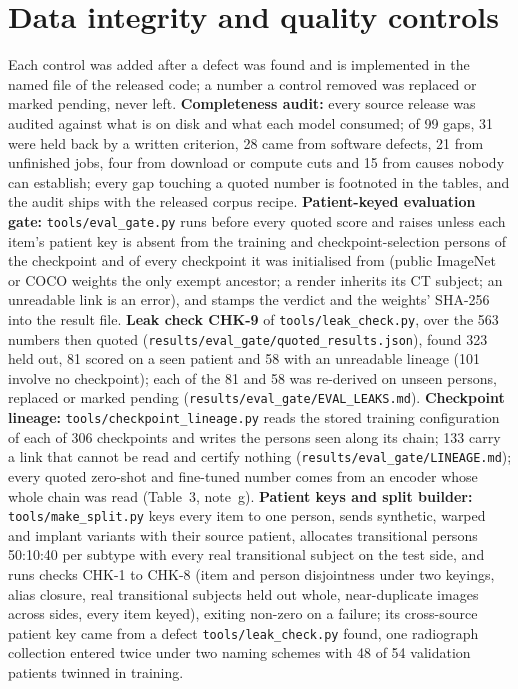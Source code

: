 \section*{Data integrity and quality controls}
Each control was added after a defect was found and is implemented in the named file of the released code; a
number a control removed was replaced or marked pending, never left. \textbf{Completeness audit:} every source
release was audited against what is on disk and what each model consumed; of 99 gaps, 31 were held back by a written
criterion, 28 came from software defects, 21 from unfinished jobs, four from download or compute cuts and 15 from
causes nobody can establish; every gap touching a quoted number is footnoted in the tables, and the audit ships with
the released corpus recipe. \textbf{Patient-keyed evaluation gate:}
\texttt{tools/eval\_gate.py} runs before every quoted score and raises unless each item's patient key is absent from
the training and checkpoint-selection persons of the checkpoint and of every checkpoint it was initialised from
(public ImageNet or COCO weights the only exempt ancestor; a render inherits its CT subject; an unreadable link is an
error), and stamps the verdict and the weights' SHA-256 into the result file.
\textbf{Leak check CHK-9} of \texttt{tools/leak\_check.py}, over the 563 numbers then quoted
(\texttt{results/eval\_gate/quoted\_results.json}), found 323 held out, 81 scored on a seen patient and 58 with an
unreadable lineage (101 involve no checkpoint); each of the 81 and 58 was re-derived on unseen persons, replaced or
marked pending (\texttt{results/eval\_gate/EVAL\_LEAKS.md}). \textbf{Checkpoint lineage:}
\texttt{tools/checkpoint\_lineage.py} reads the stored training configuration of each of 306 checkpoints and writes
the persons seen along its chain; 133 carry a link that cannot be read and certify nothing
(\texttt{results/eval\_gate/LINEAGE.md}); every quoted zero-shot and fine-tuned number comes from an encoder whose
whole chain was read (Table~3, note~g). \textbf{Patient keys and
split builder:} \texttt{tools/make\_split.py} keys every item to one person, sends synthetic, warped and implant
variants with their source patient, allocates transitional persons 50:10:40 per subtype with every real transitional
subject on the test side, and runs checks CHK-1 to CHK-8 (item and person disjointness under two keyings, alias
closure, real transitional subjects held out whole, near-duplicate images across sides, every item keyed), exiting
non-zero on a failure; its cross-source patient key came from a defect \texttt{tools/leak\_check.py} found, one
radiograph collection entered twice under two naming schemes with 48 of 54 validation patients twinned in training.

